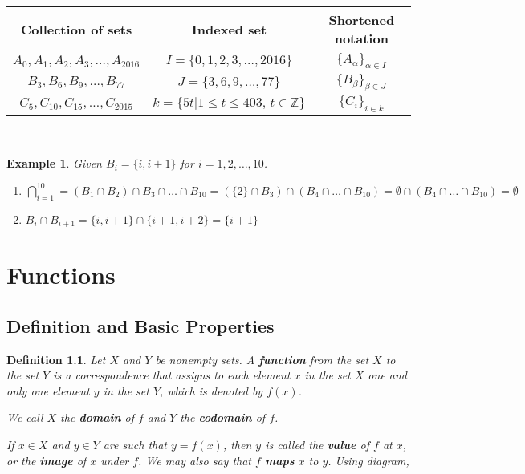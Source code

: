 \documentclass[10pt,reqno]{book}
\theoremstyle{plain}
\newtheorem{definition}[theorem]{Definition}
\newtheorem{example}{Example}
\def\Z{\mathbb{Z}}
\begin{document}
	\begin{center}
		\begin{tabular}{|c|c|c|}
			\hline
			         Collection of sets          &                  Indexed set                   &        Shortened notation         \\ \hline
			$ A_0,A_1,A_2,A_3,\dots, A_{2016} $  &         $ I = \{0,1,2,3,\dots,2016\} $         & $ \{A_{\alpha}\}_{\alpha \in I} $ \\ \hline
			    $ B_3,B_6,B_9,\dots, B_77 $      &           $ J = \{3,6,9,\dots,77\} $           &  $ \{B_{\beta}\}_{\beta \in J} $  \\ \hline
			$ C_5,C_{10},C_{15},\dots,C_{2015} $ & $ k = \{5t | 1 \leq t \leq 403, \, t\in \Z\} $ &       $ \{C_i\}_{i \in k} $       \\ \hline
		\end{tabular}\\
	\end{center}
	
	\begin{example}
		Given $ B_i = \{ i, i+1 \} $ for $ i = 1,2,\dots,10 $.
	\end{example}

	\begin{enumerate}[label=(\alph*)]
		\item $ \displaystyle{ \bigcap\limits_{i=1}^{10} = (B_1 \cap B_2) \cap B_3 \cap \dots \cap B_{10} = (\{2\} \cap B_3) \cap (B_4 \cap \dots \cap B_{10}) = \emptyset \cap (B_4 \cap \dots \cap B_{10}) = \emptyset } $
		\item $ B_i \cap B_{i+1} = \{i,i+1\} \cap \{i+1,i+2\} = \{i+1\} $
	\end{enumerate}
	
	
	
	
	
	\chapter{Functions}
	
	\section{Definition and Basic Properties}
	
	\begin{definition}
		Let $ X $ and $ Y $ be nonempty sets. A \textbf{function} from the set $ X $ to the set $ Y $ is a correspondence that assigns to each element $ x $ in the set $ X $ one and only one element $ y $ in the set $ Y $, which is denoted by $ f(x) $.
		
		We call $ X $ the \textbf{domain} of $ f $ and $ Y $ the \textbf{codomain} of $ f $.
		
		If $ x \in X $ and $ y \in Y $ are such that $ y = f(x) $, then $ y $ is called the \textbf{value} of $ f $ at $ x $, or the \textbf{image} of $ x $ under $ f $. We may also say that $ f $ \textbf{maps} $ x $ to $ y $. Using diagram,
	\end{definition}
\end{document}
